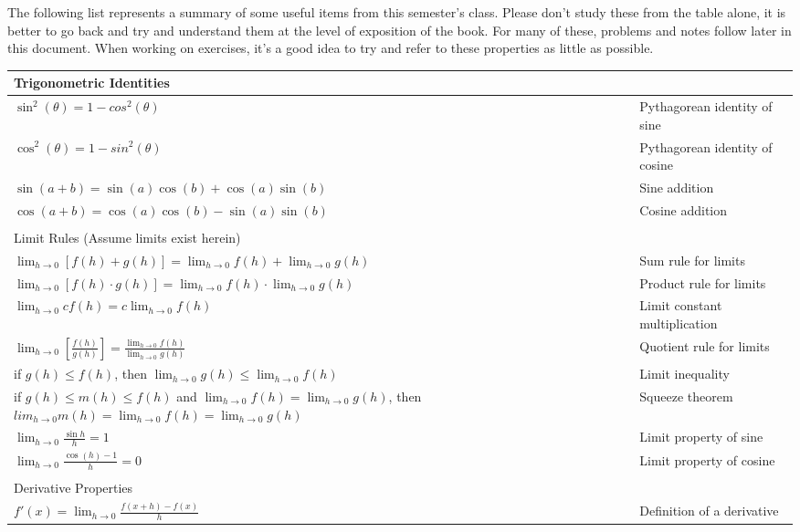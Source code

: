 \documentclass[12pt]{amsart}
\begin{document}
The following list represents a summary of some useful items from this semester's class. Please don't study these from the table alone, it is better to go back and try and understand them at the level of exposition of the book. For many of these, problems and notes follow later in this document. When working on exercises, it's a good idea to try and refer to these properties as little as possible.
\begin{center}
\begin{tabularx}{\textwidth}{ X l }
	\\ Trigonometric Identities\\ \hline
	$\sin^2(\theta) = 1 - cos^2(\theta)$ & Pythagorean identity of sine \\
	$\cos^2(\theta) = 1 - sin^2(\theta)$ & Pythagorean identity of cosine \\
	$\sin(a + b) = \sin(a)\cos(b) + \cos(a)\sin(b)$ & Sine addition \\
	$\cos(a + b) = \cos(a)\cos(b) - \sin(a)\sin(b)$ & Cosine addition \\
	\\Limit Rules (Assume limits exist herein)\\ \hline
	$\lim_{h \to 0}[f(h) + g(h)] = \lim_{h \to 0}f(h) + \lim_{h \to 0}g(h)$ & Sum rule for limits \\
	$\lim_{h \to 0}[f(h) \cdot g(h)] = \lim_{h \to 0}f(h) \cdot \lim_{h \to 0}g(h)$ & Product rule for limits \\
	$\lim_{h \to 0}c f(h) = c \lim_{h \to 0}f(h)$ & Limit constant multiplication \\
	$\lim_{h \to 0}[\frac{f(h)}{g(h)}] = \frac{\lim_{h \to 0}f(h)}{\lim_{h \to 0}g(h)}$ & Quotient rule for limits \\
	if $g(h) \leq f(h)$, then $\lim_{h \to 0}g(h) \leq \lim_{h \to 0}f(h)$ & Limit inequality \\
	if $g(h) \leq m(h) \leq f(h)$ and \newline $\lim_{h \to 0}f(h) = \lim_{h \to 0}g(h)$, then \newline $lim_{h \to 0}m(h) = \lim_{h \to 0}f(h) = \lim_{h \to 0}g(h)$ & Squeeze theorem \\
	$\lim_{h \to 0}\frac{\sin h}{h} = 1$ & Limit property of sine \\
	$\lim_{h \to 0}\frac{\cos(h) - 1}{h} = 0$ & Limit property of cosine \\
	\\Derivative Properties\\ \hline
	$f'(x) = \lim_{h \to 0} \frac{f(x+h) - f(x)}{h}$ & Definition of a derivative \\

\end{tabularx}
\end{center}
\end{document}
